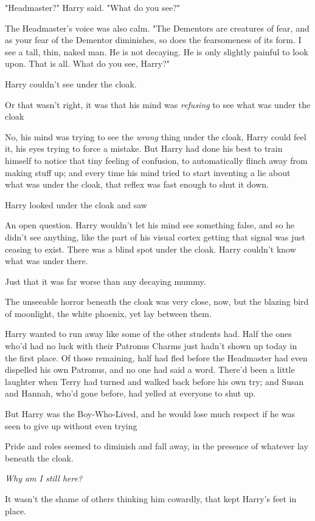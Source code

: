 "Headmaster?" Harry said. "What do you see?"

The Headmaster's voice was also calm. "The Dementors are creatures of fear, and
as your fear of the Dementor diminishes, so does the fearsomeness of its form.
I see a tall, thin, naked man. He is not decaying. He is only slightly painful
to look upon. That is all. What do you see, Harry?"

{\el} Harry couldn't see under the cloak.

Or that wasn't right, it was that his mind was \emph{refusing} to see what was
under the cloak{\el}

No, his mind was trying to see the \emph{wrong} thing under the cloak, Harry
could feel it, his eyes trying to force a mistake. But Harry had done his best
to train himself to notice that tiny feeling of confusion, to automatically
flinch away from making stuff up; and every time his mind tried to start
inventing a lie about what was under the cloak, that reflex was fast enough to
shut it down.

Harry looked under the cloak and saw{\el}

An open question. Harry wouldn't let his mind see something false, and so he
didn't see anything, like the part of his visual cortex getting that signal was
just ceasing to exist. There was a blind spot under the cloak. Harry couldn't
know what was under there.

Just that it was far worse than any decaying mummy.

The unseeable horror beneath the cloak was very close, now, but the blazing
bird of moonlight, the white phoenix, yet lay between them.

Harry wanted to run away like some of the other students had. Half the ones
who'd had no luck with their Patronus Charms just hadn't shown up today in the
first place. Of those remaining, half had fled before the Headmaster had even
dispelled his own Patronus, and no one had said a word. There'd been a little
laughter when Terry had turned and walked back before his own try; and Susan
and Hannah, who'd gone before, had yelled at everyone to shut up.

But Harry was the Boy-Who-Lived, and he would lose much respect if he was seen
to give up without even trying{\el}

Pride and roles seemed to diminish and fall away, in the presence of whatever
lay beneath the cloak.

\emph{Why am I still here?}

It wasn't the shame of others thinking him cowardly, that kept Harry's feet in
place.

